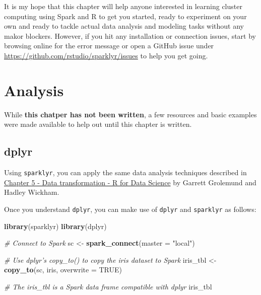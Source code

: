 \documentclass[]{book}
\newenvironment{Shaded}{\begin{snugshade}}{\end{snugshade}}
\newcommand{\CommentTok}[1]{\textcolor[rgb]{0.56,0.35,0.01}{\textit{#1}}}
\newcommand{\DataTypeTok}[1]{\textcolor[rgb]{0.13,0.29,0.53}{#1}}
\newcommand{\KeywordTok}[1]{\textcolor[rgb]{0.13,0.29,0.53}{\textbf{#1}}}
\newcommand{\NormalTok}[1]{#1}
\newcommand{\OtherTok}[1]{\textcolor[rgb]{0.56,0.35,0.01}{#1}}
\newcommand{\StringTok}[1]{\textcolor[rgb]{0.31,0.60,0.02}{#1}}
\theoremstyle{definition}
\theoremstyle{definition}
\theoremstyle{definition}
\theoremstyle{remark}
\begin{document}
It is my hope that this chapter will help anyone interested in learning
cluster computing using Spark and R to get you started, ready to
experiment on your own and ready to tackle actual data analysis and
modeling tasks without any makor blockers. However, if you hit any
installation or connection issues, start by browsing online for the
error message or open a GitHub issue under
\url{https://github.com/rstudio/sparklyr/issues} to help you get going.

\hypertarget{dplyr}{%
\chapter{Analysis}\label{dplyr}}

While \textbf{this chatper has not been written}, a few resources and
basic examples were made available to help out until this chapter is
written.

\hypertarget{dplyr-1}{%
\section{dplyr}\label{dplyr-1}}

Using \texttt{sparklyr}, you can apply the same data analysis techniques
described in \href{http://r4ds.had.co.nz/transform.html}{Chapter 5 -
Data transformation - R for Data Science} by Garrett Grolemund and
Hadley Wickham.

Once you understand \texttt{dplyr}, you can make use of \texttt{dplyr}
and \texttt{sparklyr} as follows:

\begin{Shaded}
\begin{Highlighting}[]
\KeywordTok{library}\NormalTok{(sparklyr)}
\KeywordTok{library}\NormalTok{(dplyr)}

\CommentTok{# Connect to Spark}
\NormalTok{sc <-}\StringTok{ }\KeywordTok{spark_connect}\NormalTok{(}\DataTypeTok{master =} \StringTok{"local"}\NormalTok{)}

\CommentTok{# Use dplyr's copy_to() to copy the iris dataset to Spark}
\NormalTok{iris_tbl <-}\StringTok{ }\KeywordTok{copy_to}\NormalTok{(sc, iris, }\DataTypeTok{overwrite =} \OtherTok{TRUE}\NormalTok{)}

\CommentTok{# The iris_tbl is a Spark data frame compatible with dplyr}
\NormalTok{iris_tbl}
\end{Highlighting}
\end{Shaded}
\end{document}
